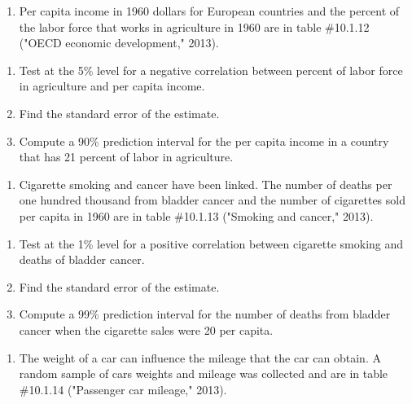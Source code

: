 \documentclass[]{book}
\providecommand{\tightlist}{%
  \setlength{\itemsep}{0pt}\setlength{\parskip}{0pt}}
\begin{document}
\begin{enumerate}
\def\labelenumi{\arabic{enumi}.}
\setcounter{enumi}{7}
\tightlist
\item
  Per capita income in 1960 dollars for European countries and the percent of the labor force that works in agriculture in 1960 are in table \#10.1.12 ("OECD economic development," 2013).
\end{enumerate}

\begin{enumerate}
\def\labelenumi{\alph{enumi}.}
\item
  Test at the 5\% level for a negative correlation between percent of labor force in agriculture and per capita income.
\item
  Find the standard error of the estimate.
\item
  Compute a 90\% prediction interval for the per capita income in a country that has 21 percent of labor in agriculture.
\end{enumerate}

\begin{enumerate}
\def\labelenumi{\arabic{enumi}.}
\setcounter{enumi}{8}
\tightlist
\item
  Cigarette smoking and cancer have been linked. The number of deaths per one hundred thousand from bladder cancer and the number of cigarettes sold per capita in 1960 are in table \#10.1.13 ("Smoking and cancer," 2013).
\end{enumerate}

\begin{enumerate}
\def\labelenumi{\alph{enumi}.}
\item
  Test at the 1\% level for a positive correlation between cigarette smoking and deaths of bladder cancer.
\item
  Find the standard error of the estimate.
\item
  Compute a 99\% prediction interval for the number of deaths from bladder cancer when the cigarette sales were 20 per capita.
\end{enumerate}

\begin{enumerate}
\def\labelenumi{\arabic{enumi}.}
\setcounter{enumi}{9}
\tightlist
\item
  The weight of a car can influence the mileage that the car can obtain. A random sample of cars weights and mileage was collected and are in table \#10.1.14 ("Passenger car mileage," 2013).
\end{enumerate}
\end{document}
